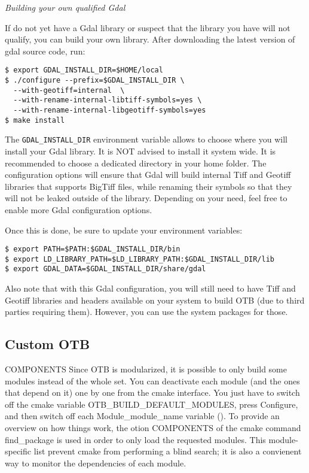 \emph{Building your own qualified Gdal}

If do not yet have a Gdal library or suspect that the library you have will not qualify, you can build your own library. After downloading the latest version of gdal source code, run:

\begin{verbatim}
$ export GDAL_INSTALL_DIR=$HOME/local
$ ./configure --prefix=$GDAL_INSTALL_DIR \
  --with-geotiff=internal  \
  --with-rename-internal-libtiff-symbols=yes \
  --with-rename-internal-libgeotiff-symbols=yes
$ make install
\end{verbatim}

The \texttt{GDAL\_INSTALL\_DIR} environment variable allows to choose where you will install your Gdal library. It is NOT advised to install it system wide. It is recommended to choose a dedicated directory in your home folder. The configuration options will ensure that Gdal will build internal Tiff and Geotiff libraries that supports BigTiff files, while renaming their symbols so that they will not be leaked outside of the library. Depending on your need, feel free to enable more Gdal configuration options.

Once this is done, be sure to update your environment variables:
\begin{verbatim}
$ export PATH=$PATH:$GDAL_INSTALL_DIR/bin
$ export LD_LIBRARY_PATH=$LD_LIBRARY_PATH:$GDAL_INSTALL_DIR/lib
$ export GDAL_DATA=$GDAL_INSTALL_DIR/share/gdal
\end{verbatim}

Also note that with this Gdal configuration, you will still need to have Tiff and Geotiff libraries and headers available on your system to build OTB (due to third parties requiring them). However, you can use the system packages for those.

\subsection{Custom OTB}
COMPONENTS
Since OTB is modularized, it is possible to only build some modules instead of the whole set. 
You can deactivate each module (and the ones that depend on it) one by one from the cmake interface. 
You just have to switch off the cmake variable OTB\_BUILD\_DEFAULT\_MODULES, press Configure, and then switch off each Module\_module\_name variable (\*).
To provide an overview on how things work, the otion COMPONENTS of the cmake command find\_package is used in order to only load the requested modules.
This module-specific list prevent cmake from performing a blind search; it is also a convienent way to monitor the dependencies of each module.


